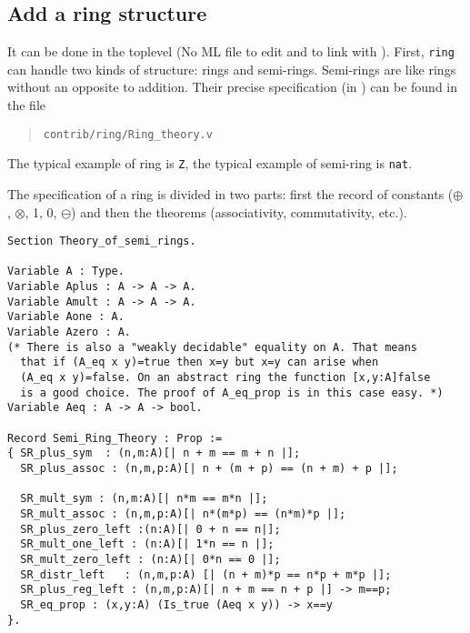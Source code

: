 \subsection{Add a ring structure}

It can be done in the \Coq toplevel (No ML file to edit and to link
with \Coq). First, \texttt{ring} can handle two kinds of structure:
rings and semi-rings. Semi-rings are like rings without an opposite to
addition. Their precise specification (in \gallina) can be found in
the file

\begin{quotation}
\begin{verbatim}
contrib/ring/Ring_theory.v
\end{verbatim}
\end{quotation}

The typical example of ring is \texttt{Z}, the typical
example of semi-ring is \texttt{nat}.

The specification of a
ring is divided in two parts: first the record of constants
($\oplus$, $\otimes$, 1, 0, $\ominus$) and then the theorems
(associativity, commutativity, etc.).

\begin{small}
\begin{flushleft}
\begin{verbatim}
Section Theory_of_semi_rings.

Variable A : Type.
Variable Aplus : A -> A -> A.
Variable Amult : A -> A -> A.
Variable Aone : A.
Variable Azero : A.
(* There is also a "weakly decidable" equality on A. That means 
  that if (A_eq x y)=true then x=y but x=y can arise when 
  (A_eq x y)=false. On an abstract ring the function [x,y:A]false
  is a good choice. The proof of A_eq_prop is in this case easy. *)
Variable Aeq : A -> A -> bool.

Record Semi_Ring_Theory : Prop :=
{ SR_plus_sym  : (n,m:A)[| n + m == m + n |];
  SR_plus_assoc : (n,m,p:A)[| n + (m + p) == (n + m) + p |];

  SR_mult_sym : (n,m:A)[| n*m == m*n |];
  SR_mult_assoc : (n,m,p:A)[| n*(m*p) == (n*m)*p |];
  SR_plus_zero_left :(n:A)[| 0 + n == n|];
  SR_mult_one_left : (n:A)[| 1*n == n |];
  SR_mult_zero_left : (n:A)[| 0*n == 0 |];
  SR_distr_left   : (n,m,p:A) [| (n + m)*p == n*p + m*p |];
  SR_plus_reg_left : (n,m,p:A)[| n + m == n + p |] -> m==p;
  SR_eq_prop : (x,y:A) (Is_true (Aeq x y)) -> x==y
}.
\end{verbatim}
\end{flushleft}
\end{small}


